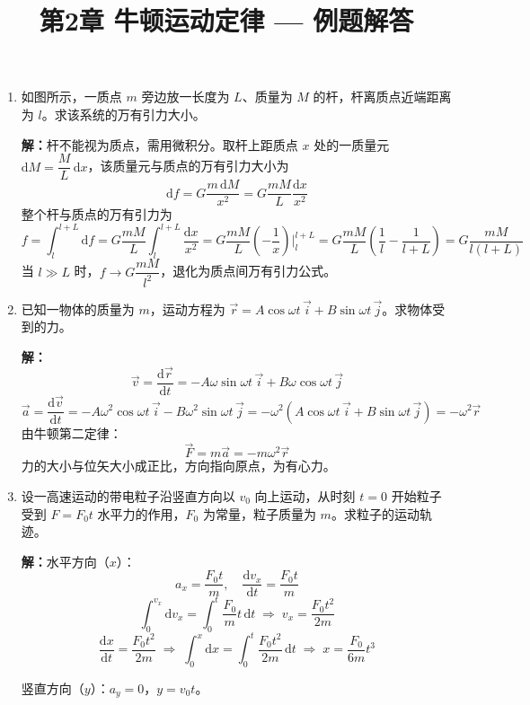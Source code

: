 \documentclass{ctexart}
\title{\textbf{第2章 牛顿运动定律} --- 例题解答}
\author{}
\date{}
\begin{document}
\maketitle

\begin{enumerate}

\item 如图所示，一质点 $m$ 旁边放一长度为 $L$、质量为 $M$ 的杆，杆离质点近端距离为 $l$。求该系统的万有引力大小。

\textbf{解：}杆不能视为质点，需用微积分。取杆上距质点 $x$ 处的一质量元 $\mathrm{d}M = \dfrac{M}{L}\,\mathrm{d}x$，该质量元与质点的万有引力大小为
\[
\mathrm{d}f = G\frac{m\,\mathrm{d}M}{x^{2}} = G\frac{mM}{L}\frac{\mathrm{d}x}{x^{2}}
\]
整个杆与质点的万有引力为
\[
f = \int_{l}^{l+L} \mathrm{d}f = G\frac{mM}{L}\int_{l}^{l+L}\frac{\mathrm{d}x}{x^{2}}
= G\frac{mM}{L}\left(-\frac{1}{x}\right)\bigg|_{l}^{l+L}
= G\frac{mM}{L}\left(\frac{1}{l} - \frac{1}{l+L}\right)
= G\frac{mM}{l(l+L)}
\]
当 $l \gg L$ 时，$f \to G\dfrac{mM}{l^{2}}$，退化为质点间万有引力公式。

\item 已知一物体的质量为 $m$，运动方程为 $\vec{r} = A\cos\omega t\,\vec{i} + B\sin\omega t\,\vec{j}$。求物体受到的力。

\textbf{解：}
\[
\vec{v} = \frac{\mathrm{d}\vec{r}}{\mathrm{d}t} = -A\omega\sin\omega t\,\vec{i} + B\omega\cos\omega t\,\vec{j}
\]
\[
\vec{a} = \frac{\mathrm{d}\vec{v}}{\mathrm{d}t} = -A\omega^{2}\cos\omega t\,\vec{i} - B\omega^{2}\sin\omega t\,\vec{j}
= -\omega^{2}(A\cos\omega t\,\vec{i} + B\sin\omega t\,\vec{j}) = -\omega^{2}\vec{r}
\]
由牛顿第二定律：
\[
\vec{F} = m\vec{a} = -m\omega^{2}\vec{r}
\]
力的大小与位矢大小成正比，方向指向原点，为有心力。

\item 设一高速运动的带电粒子沿竖直方向以 $v_0$ 向上运动，从时刻 $t=0$ 开始粒子受到 $F = F_0 t$ 水平力的作用，$F_0$ 为常量，粒子质量为 $m$。求粒子的运动轨迹。

\textbf{解：}水平方向（$x$）：
\[
a_x = \frac{F_0 t}{m},\quad \frac{\mathrm{d}v_x}{\mathrm{d}t} = \frac{F_0 t}{m}
\]
\[
\int_{0}^{v_x} \mathrm{d}v_x = \int_{0}^{t} \frac{F_0}{m}t\,\mathrm{d}t \;\Longrightarrow\; v_x = \frac{F_0 t^{2}}{2m}
\]
\[
\frac{\mathrm{d}x}{\mathrm{d}t} = \frac{F_0 t^{2}}{2m} \;\Longrightarrow\; \int_{0}^{x} \mathrm{d}x = \int_{0}^{t} \frac{F_0 t^{2}}{2m}\,\mathrm{d}t \;\Longrightarrow\; x = \frac{F_0}{6m}t^{3}
\]

竖直方向（$y$）：$a_y = 0$，$y = v_0 t$。


\end{enumerate}
\end{document}
